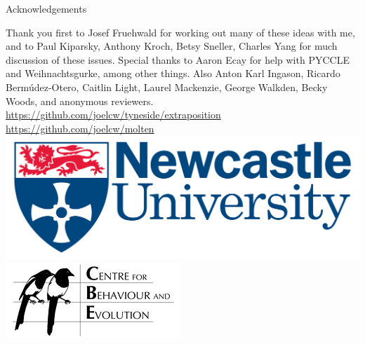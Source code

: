\documentclass[hyperref={pdfpagelabels=false}]{beamer}
\begin{document}


\begin{frame}{Acknowledgements}
\begin{center}
Thank you first to Josef Fruehwald for working out many of these ideas with me, and to Paul Kiparsky, Anthony Kroch, Betsy Sneller, Charles Yang for much discussion of these issues. Special thanks to Aaron Ecay for help with PYCCLE and Weihnachtsgurke, among other things. Also Anton Karl Ingason, Ricardo Bermúdez-Otero, Caitlin Light, Laurel Mackenzie, George Walkden, Becky Woods, and anonymous reviewers.
\vspace{5mm}\\
\url{https://github.com/joelcw/tyneside/extraposition}\\\url{https://github.com/joelcw/molten}\\\vspace{3mm}
\includegraphics[scale = 0.1]{ncllogo.jpg} \includegraphics[scale = 0.4]{cbelogo.jpg} 
\end{center}
\end{frame}
\end{document}
